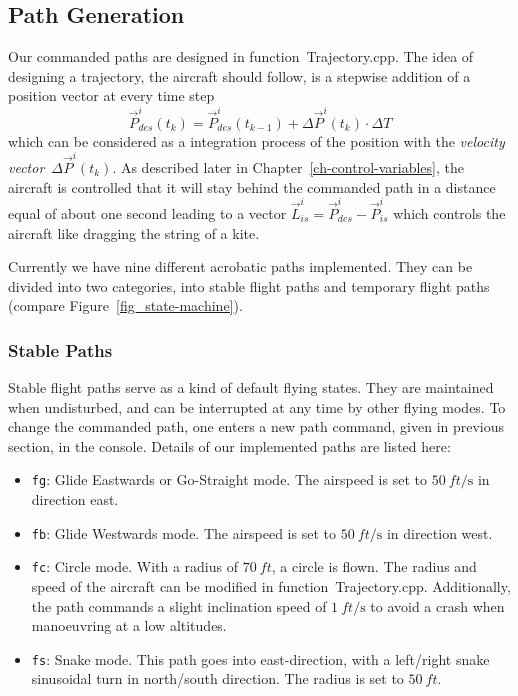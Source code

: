 \documentclass[11pt,a4paper]{scrartcl}		%
\begin{document}
\subsection{Path Generation} \label{ch-Path-Generation}

Our commanded paths are designed in function~\textsf{Trajectory.cpp}. 
The idea of designing a trajectory, the aircraft should follow, is a stepwise addition of a position vector at every time step
\begin{equation}
\vec{P}^i_{des}(t_k)=\vec{P}^i_{des}(t_{k-1}) + \Delta\vec{P}^i(t_k) \cdot \Delta T
\end{equation}
which can be considered as a integration process of the position with the \textsl{velocity vector}~$\Delta\vec{P}^i(t_k)$.
As described later in Chapter~\ref{ch-control-variables}, the aircraft is controlled that it will stay behind the commanded path in a distance equal of about one second leading to a vector $\vec{L}_{is}^i = \vec{P}_{des}^i - \vec{P}_{is}^i$ which controls the aircraft like dragging the string of a kite.

\medskip

Currently we have nine different acrobatic paths implemented. They can be divided into two categories, into stable flight paths and temporary flight paths (compare Figure~\ref{fig_state-machine}).

\subsubsection*{Stable Paths}
Stable flight paths serve as a kind of default flying states.
They are maintained when undisturbed, and can be interrupted at any time by other flying modes. To change the commanded path, one enters a new path command, given in previous section, in the console.
Details of our implemented paths are listed here:

\begin{itemize}

\item
\texttt{fg}: Glide Eastwards or Go-Straight mode. The airspeed is set to $\SI{50}{ft\per\second}$ in direction east.

\item
\texttt{fb}: Glide Westwards mode. The airspeed is set to $\SI{50}{ft\per\second}$ in direction west.

\item
\texttt{fc}: Circle mode. With a radius of $\SI{70}{ft}$, a circle is flown. 
The radius and speed of the aircraft can be modified in function~\textsf{Trajectory.cpp}. Additionally, the path commands a slight inclination speed of $\SI{1}{ft\per\second}$ to avoid a crash when manoeuvring at a low altitudes.

\item
\texttt{fs}: Snake mode. This path goes into east-direction, with a left/right snake sinusoidal turn in north/south direction. The radius is set to $\SI{50}{ft}$.

\end{itemize}
\end{document}

